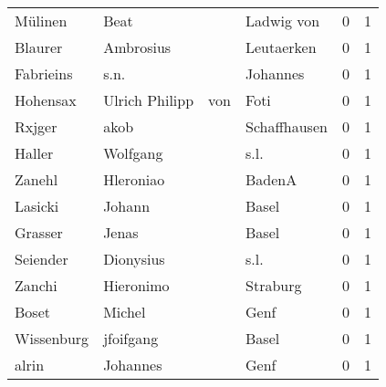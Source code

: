 \begin{tabular}{llllrr}
                  Mülinen &                               Beat &             &                                  Ladwig von &          0 &         1 \\
                  Blaurer &                          Ambrosius &             &                                  Leutaerken &          0 &         1 \\
                Fabrieins &                               s.n. &             &                                    Johannes &          0 &         1 \\
                 Hohensax &                     Ulrich Philipp &         von &                                        Foti &          0 &         1 \\
                   Rxjger &                               akob &             &                                Schaffhausen &          0 &         1 \\
                   Haller &                           Wolfgang &             &                                        s.l. &          0 &         1 \\
                   Zanehl &                          Hleroniao &             &                                      BadenA &          0 &         1 \\
                  Lasicki &                             Johann &             &                                       Basel &          0 &         1 \\
                  Grasser &                              Jenas &             &                                       Basel &          0 &         1 \\
                 Seiender &                          Dionysius &             &                                        s.l. &          0 &         1 \\
                   Zanchi &                          Hieronimo &             &                                    Straburg &          0 &         1 \\
                    Boset &                             Michel &             &                                        Genf &          0 &         1 \\
               Wissenburg &                          jfoifgang &             &                                       Basel &          0 &         1 \\
                    alrin &                           Johannes &             &                                        Genf &          0 &         1 \\

\end{tabular}
